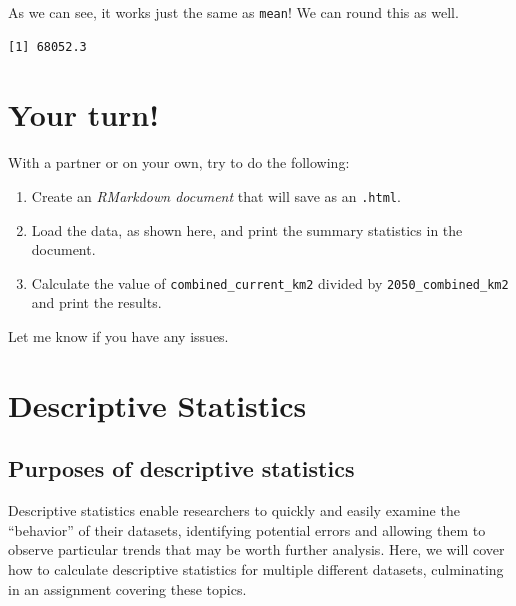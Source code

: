 \documentclass[
  letterpaper,
  DIV=11,
  numbers=noendperiod]{scrreprt}
\newenvironment{Shaded}{\begin{snugshade}}{\end{snugshade}}
\newcommand{\DecValTok}[1]{\textcolor[rgb]{0.68,0.00,0.00}{#1}}
\newcommand{\FunctionTok}[1]{\textcolor[rgb]{0.28,0.35,0.67}{#1}}
\newcommand{\NormalTok}[1]{\textcolor[rgb]{0.00,0.23,0.31}{#1}}
\newcommand{\SpecialCharTok}[1]{\textcolor[rgb]{0.37,0.37,0.37}{#1}}
\providecommand{\tightlist}{%
  \setlength{\itemsep}{0pt}\setlength{\parskip}{0pt}}\usepackage{longtable,booktabs,array}
\begin{document}
As we can see, it works just the same as \texttt{mean}! We can round
this as well.

\begin{Shaded}
\end{Shaded}

\begin{verbatim}
[1] 68052.3
\end{verbatim}


\chapter{Your turn!}\label{your-turn}

With a partner or on your own, try to do the following:

\begin{enumerate}
\def\labelenumi{\arabic{enumi}.}
\tightlist
\item
  Create an \emph{RMarkdown document} that will save as an
  \texttt{.html}.
\item
  Load the data, as shown here, and print the summary statistics in the
  document.
\item
  Calculate the value of \texttt{combined\_current\_km2} divided by
  \texttt{2050\_combined\_km2} and print the results.
\end{enumerate}

Let me know if you have any issues.


\chapter{Descriptive Statistics}\label{descriptive-statistics}

\section{Purposes of descriptive
statistics}\label{purposes-of-descriptive-statistics}

Descriptive statistics enable researchers to quickly and easily examine
the ``behavior'' of their datasets, identifying potential errors and
allowing them to observe particular trends that may be worth further
analysis. Here, we will cover how to calculate descriptive statistics
for multiple different datasets, culminating in an assignment covering
these topics.
\end{document}
